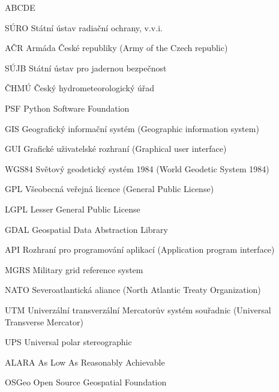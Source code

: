 
\begin{seznamzkratek}{ABCDE}

	      {SÚRO}
	      {Státní ústav radiační ochrany, v.v.i.}
	      
	     {AČR}
	     {Armáda České republiky (Army of the Czech republic)}	  
	     
	      {SÚJB}
	      {Státní ústav pro jadernou bezpečnost}
	      
	      {ČHMÚ}
	      {Český hydrometeorologický úřad}	         
	      
		  {PSF}
	      {Python Software Foundation}

	      {GIS}
	      {Geografický informační systém (Geographic information system)}
	         
	      {GUI}
	      {Grafické uživatelské rozhraní (Graphical user interface)}
	           
	      {WGS84}
	      {Světový geodetický systém 1984 (World Geodetic System 1984)}

	      {GPL}
	      {Všeobecná veřejná licence (General Public License)}
	      
	      {LGPL}
	      {Lesser General Public License}	      
	      
	      {GDAL}
	      {Geospatial Data Abstraction Library}
	      
	      {API}
	      {Rozhraní pro programování aplikací (Application program interface)}	      
	    
	      {MGRS}
	      {Military grid reference system}
	      
	      {NATO}
	      {Severoatlantická aliance (North Atlantic Treaty Organization)}
	      
	      {UTM}
	      {Univerzální transverzální Mercatorův systém souřadnic (Universal Transverse Mercator)}	
	      
	      {UPS}
	      {Universal polar stereographic}	
	      
	      {ALARA}
	      {As Low As Reasonably Achievable}     
	      
	      {OSGeo}
	      {Open Source Geospatial Foundation} 
	      

\end{seznamzkratek}
